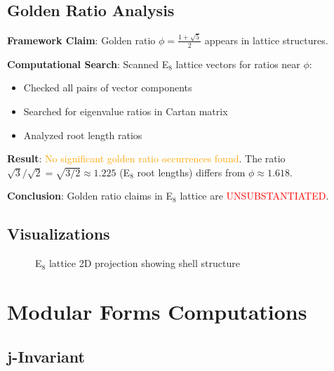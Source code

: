 \subsection{Golden Ratio Analysis}

\textbf{Framework Claim}: Golden ratio $\phi = \frac{1+\sqrt{5}}{2}$ appears in lattice structures.

\textbf{Computational Search}: Scanned E$_8$ lattice vectors for ratios near $\phi$:
\begin{itemize}
    \item Checked all pairs of vector components
    \item Searched for eigenvalue ratios in Cartan matrix
    \item Analyzed root length ratios
\end{itemize}

\textbf{Result}: \textcolor{orange}{No significant golden ratio occurrences found}. The ratio $\sqrt{3}/\sqrt{2} = \sqrt{3/2} \approx 1.225$ (E$_8$ root lengths) differs from $\phi \approx 1.618$.

\textbf{Conclusion}: Golden ratio claims in E$_8$ lattice are \textcolor{red}{UNSUBSTANTIATED}.

\subsection{Visualizations}

\begin{figure}[H]
\centering
{}
\caption{E$_8$ lattice 2D projection showing shell structure}
\label{fig:e8_lattice}
\end{figure}

\section{Modular Forms Computations}

\subsection{j-Invariant}

